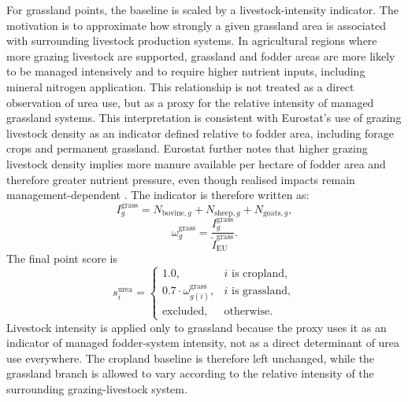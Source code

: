 For grassland points, the baseline is scaled by a livestock-intensity
indicator. The motivation is to approximate how strongly a given
grassland area is associated with surrounding livestock production
systems. In agricultural regions where more grazing livestock are
supported, grassland and fodder areas are more likely to be managed
intensively and to require higher nutrient inputs, including mineral
nitrogen application. This relationship is not treated as a direct
observation of urea use, but as a proxy for the relative intensity of
managed grassland systems. This interpretation is consistent with
Eurostat's use of grazing livestock density as an indicator defined
relative to fodder area, including forage crops and permanent
grassland. Eurostat further notes that higher grazing livestock density
implies more manure available per hectare of fodder area and therefore
greater nutrient pressure, even though realised impacts remain
management-dependent
\citep{EurostatLivestockPatterns,EurostatGrazingGlossary}. The indicator
is therefore written as:
\begin{equation}
  I_g^{\mathrm{grass}} =
  N_{\mathrm{bovine},g} +
  N_{\mathrm{sheep},g} +
  N_{\mathrm{goats},g},
\end{equation}
\begin{equation}
  \omega_g^{\mathrm{grass}} =
  \frac{I_g^{\mathrm{grass}}}{\tilde{I}_{\mathrm{EU}}^{\mathrm{grass}}}.
\end{equation}
The final point score is
\begin{equation}
  s_i^{\mathrm{urea}} =
  \begin{cases}
    1.0, & i \text{ is cropland},\\[3pt]
    0.7 \cdot \omega_{g(i)}^{\mathrm{grass}}, & i \text{ is grassland},\\[3pt]
    \text{excluded}, & \text{otherwise}.
  \end{cases}
\end{equation}
Livestock intensity is applied only to grassland because the proxy uses
it as an indicator of managed fodder-system intensity, not as a direct
determinant of urea use everywhere. The cropland baseline is therefore
left unchanged, while the grassland branch is allowed to vary according
to the relative intensity of the surrounding grazing-livestock system.

